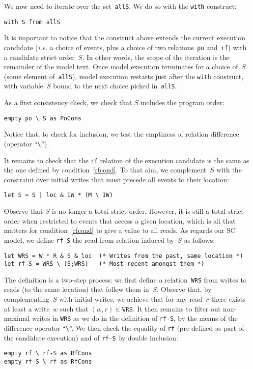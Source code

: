 \label{intro:with}We now need to iterate over the set~\verb+allS+.
We do so with the \verb+with+ construct:
\begin{verbatim}
with S from allS
\end{verbatim}
It is important to notice that the construct above extends the current
execution candidate (\emph{i.e.} a choice of events, plus a choice of
two relations~\texttt{po} and~\texttt{rf}) with a candidate strict order~$S$.
In other words, the scope of the iteration is the remainder of the model text.
Once model execution terminates for a choice of~$S$
(some element of~\texttt{allS}), model execution restarts just
after the \texttt{with} construct, with variable~$S$ bound to
the next choice picked in~\texttt{allS}.

As a first consistency check, we check that $S$ includes the program order:
\begin{verbatim}
empty po \ S as PoCons
\end{verbatim}
Notice that, to check for inclusion, we test the emptiness of relation
difference (operator ``\verb+\+'').


It remains to check that the \texttt{rf} relation of the execution candidate
is the same as the one defined by condition~\ref{rfcond}.
To that aim, we complement~$S$ with the constraint over initial
writes that  must precede all events to their location:
\begin{verbatim}
let S = S | loc & IW * (M \ IW)
\end{verbatim}
Observe that $S$ is no longer a total strict order. However, it is still a total
strict order when restricted to events that access a given location,
which is all that matters for condition~\ref{rfcond} to give a value
to all reads. As regards our SC model, we define \texttt{rf-S}
the read-from relation induced by~$S$ as follows:
\begin{verbatim}
let WRS = W * R & S & loc  (* Writes from the past, same location *)
let rf-S = WRS \ (S;WRS)   (* Most recent amongst them *)
\end{verbatim}
The definition is a two-step process: we first define
a relation~\texttt{WRS} from writes to reads (to the same location)
that follow them in~$S$. Observe that,
by complementing~$S$ with initial writes, we achieve that for any read~$r$
there exists at least a write~$w$ such that $(w,r) \in \texttt{WRS}$.
It then remains to filter out non-maximal writes in \texttt{WRS}
as we do in the definition of \texttt{rf-S}, by the means of
the difference operator ``\verb+\+''.
We then check the equality of \texttt{rf} (pre-defined as part of the candidate
execution) and of \texttt{rf-S} by double inclusion:
\begin{verbatim}
empty rf \ rf-S as RfCons
empty rf-S \ rf as RfCons
\end{verbatim}

